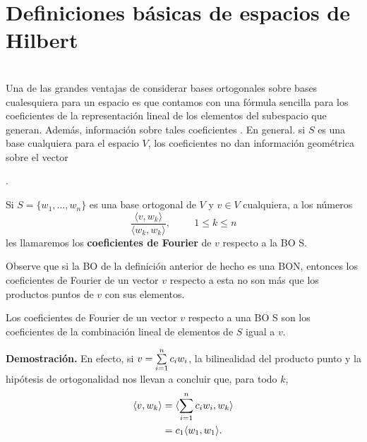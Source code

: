 \section{Definiciones básicas de espacios de Hilbert}


 \\



Una de las
grandes ventajas de considerar
bases ortogonales sobre bases cualesquiera para un espacio es que
contamos con una fórmula sencilla
para los coeficientes de la representación lineal de los
elementos del subespacio que generan. Además, información
sobre tales coeficientes .
En general. si $S$ es una base cualquiera para
el espacio $V$, los coeficientes no dan información
geométrica sobre el vector  \\
 

. 
 
 
 
 
\begin{defi}
Si $S=\{ w_{1}, \ldots , w_{n} \}$ es una base
ortogonal de $V$ y $v \in V$ cualquiera, a los
números
\[
\frac{\langle v , w_{k} \rangle}{\langle  w_{k}, w_{k} \rangle},
\hspace{1cm} 1 \leq k \leq n
\]
les llamaremos los \textbf{coeficientes de Fourier}
de $v$ respecto a la BO S.
\end{defi}

Observe que si la BO de la definición anterior de hecho
es una BON, entonces los coeficientes de Fourier de un 
vector $v$ respecto a esta no son más que los productos
puntos de $v$ con sus elementos.

\begin{prop}
Los coeficientes de Fourier de un vector $v$
respecto a una BO S son los coeficientes
de la combinación lineal de elementos de $S$ igual a $v$.
\end{prop}
\noindent
\textbf{Demostración.}
En efecto, si $v=\sum\limits_{i=1}^{n}c_{i}w_{i}$,
la bilinealidad del producto punto y la hipótesis 
de ortogonalidad nos llevan a concluir que, 
para todo $k$,
\begin{align*}
\langle  v , w_{k} \rangle &= \langle \sum\limits_{i=1}^{n}c_{i}w_{i}  , w_{k} \rangle \\
& = c_{1} \langle w_{1}  , w_{1} \rangle.
\end{align*}
\QEDB
\vspace{0.2cm}




